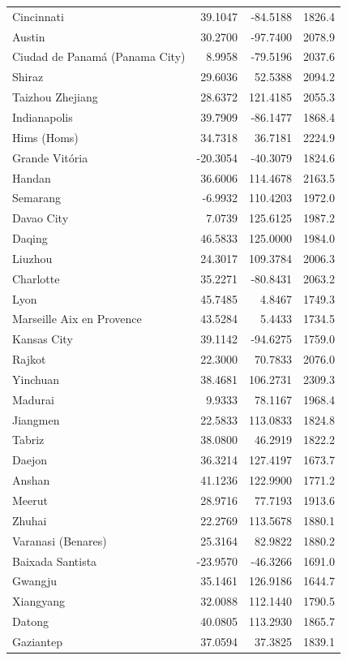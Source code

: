 \begin{longtable}{lrrc}
Cincinnati & 39.1047 & -84.5188 & 1826.4 \\
Austin & 30.2700 & -97.7400 & 2078.9 \\
Ciudad de Panamá (Panama City) & 8.9958 & -79.5196 & 2037.6 \\
Shiraz & 29.6036 & 52.5388 & 2094.2 \\
Taizhou  Zhejiang & 28.6372 & 121.4185 & 2055.3 \\
Indianapolis & 39.7909 & -86.1477 & 1868.4 \\
Hims (Homs) & 34.7318 & 36.7181 & 2224.9 \\
Grande Vitória & -20.3054 & -40.3079 & 1824.6 \\
Handan & 36.6006 & 114.4678 & 2163.5 \\
Semarang & -6.9932 & 110.4203 & 1972.0 \\
Davao City & 7.0739 & 125.6125 & 1987.2 \\
Daqing & 46.5833 & 125.0000 & 1984.0 \\
Liuzhou & 24.3017 & 109.3784 & 2006.3 \\
Charlotte & 35.2271 & -80.8431 & 2063.2 \\
Lyon & 45.7485 & 4.8467 & 1749.3 \\
Marseille Aix en Provence & 43.5284 & 5.4433 & 1734.5 \\
Kansas City & 39.1142 & -94.6275 & 1759.0 \\
Rajkot & 22.3000 & 70.7833 & 2076.0 \\
Yinchuan & 38.4681 & 106.2731 & 2309.3 \\
Madurai & 9.9333 & 78.1167 & 1968.4 \\
Jiangmen & 22.5833 & 113.0833 & 1824.8 \\
Tabriz & 38.0800 & 46.2919 & 1822.2 \\
Daejon & 36.3214 & 127.4197 & 1673.7 \\
Anshan & 41.1236 & 122.9900 & 1771.2 \\
Meerut & 28.9716 & 77.7193 & 1913.6 \\
Zhuhai & 22.2769 & 113.5678 & 1880.1 \\
Varanasi (Benares) & 25.3164 & 82.9822 & 1880.2 \\
Baixada Santista & -23.9570 & -46.3266 & 1691.0 \\
Gwangju & 35.1461 & 126.9186 & 1644.7 \\
Xiangyang & 32.0088 & 112.1440 & 1790.5 \\
Datong & 40.0805 & 113.2930 & 1865.7 \\
Gaziantep & 37.0594 & 37.3825 & 1839.1 \\

\end{longtable}
